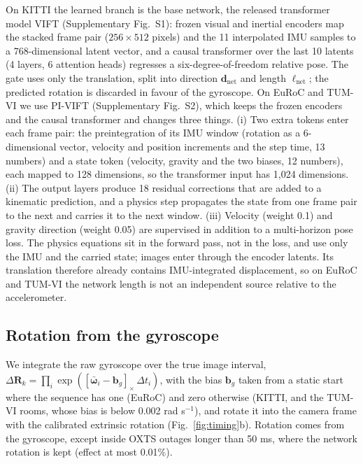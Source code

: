 \documentclass[pdflatex,sn-nature]{sn-jnl}
\newcommand{\dnet}{\mathbf{d}_{\mathrm{net}}}
\begin{document}
On KITTI the learned branch is the base network, the released transformer model VIFT\cite{Kurt2024} (Supplementary Fig.~S1): frozen visual and inertial encoders map the stacked frame pair ($256\times512$ pixels) and the 11 interpolated IMU samples to a 768-dimensional latent vector, and a causal transformer over the last 10 latents (4 layers, 6 attention heads) regresses a six-degree-of-freedom relative pose. The gate uses only the translation, split into direction $\dnet$ and length $\ell_\mathrm{net}$; the predicted rotation is discarded in favour of the gyroscope. On EuRoC and TUM-VI we use PI-VIFT (Supplementary Fig.~S2), which keeps the frozen encoders and the causal transformer and changes three things. (i) Two extra tokens enter each frame pair: the preintegration of its IMU window (rotation as a 6-dimensional vector, velocity and position increments and the step time, 13 numbers) and a state token (velocity, gravity and the two biases, 12 numbers), each mapped to 128 dimensions, so the transformer input has 1,024 dimensions. (ii) The output layers produce 18 residual corrections that are added to a kinematic prediction, and a physics step propagates the state from one frame pair to the next and carries it to the next window. (iii) Velocity (weight 0.1) and gravity direction (weight 0.05) are supervised in addition to a multi-horizon pose loss. The physics equations sit in the forward pass, not in the loss, and use only the IMU and the carried state; images enter through the encoder latents. Its translation therefore already contains IMU-integrated displacement, so on EuRoC and TUM-VI the network length is not an independent source relative to the accelerometer.

\subsection{Rotation from the gyroscope}

We integrate the raw gyroscope over the true image interval, $\Delta\mathbf{R}_k=\prod_i \exp([\bar{\boldsymbol{\omega}}_i-\mathbf{b}_g]_\times\,\Delta t_i)$, with the bias $\mathbf{b}_g$ taken from a static start where the sequence has one (EuRoC) and zero otherwise (KITTI, and the TUM-VI rooms, whose bias is below 0.002 rad s$^{-1}$), and rotate it into the camera frame with the calibrated extrinsic rotation (Fig.~\ref{fig:timing}b). Rotation comes from the gyroscope, except inside OXTS outages longer than 50 ms, where the network rotation is kept (effect at most 0.01\%).
\end{document}
